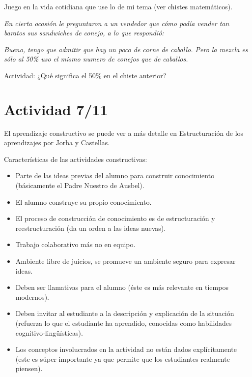 \documentclass[12pt]{report}
\newcounter{it}
\theoremstyle{largebreak}
\begin{document}
    \begin{excer}
        Juego en la vida cotidiana que use lo de mi tema (ver chistes matemáticos).
    \end{excer}

    \begin{center}
        \textit{En cierta ocasión le preguntaron a un vendedor que cómo podía vender tan baratos sus sandwiches de conejo, a lo que respondió:}

        \textit{Bueno, tengo que admitir que hay un poco de carne de caballo. Pero la mezcla es sólo al 50\% uso el mismo numero de conejos que de caballos.}
    \end{center}

    Actividad: ¿Qué significa el 50\% en el chiste anterior?

    \section{Actividad 7/11}

    El aprendizaje constructivo se puede ver a más detalle en Estructuración de los aprendizajes por Jorba y Castellas.

    Características de las actividades constructivas:
    \begin{itemize}
        \item Parte de las ideas previas del alumno para construir conocimiento (básicamente el Padre Nuestro de Ausbel).
        \item El alumno construye su propio conocimiento.
        \item El proceso de construcción de conocimiento es de estructuración y reestructuración (da un orden a las ideas nuevas). 
        \item Trabajo colaborativo más no en equipo.
        \item Ambiente libre de juicios, se promueve un ambiente seguro para expresar ideas.
        \item Deben ser llamativas para el alumno (éste es más relevante en tiempos modernos).
        \item Deben invitar al estudiante a la descripción y explicación de la situación (refuerza lo que el estudiante ha aprendido, conocidas como habilidades cognitivo-lingüísticas).
        \item Los conceptos involucrados en la actividad no están dados explícitamente (este es súper importante ya que permite que los estudiantes realmente piensen).
    \end{itemize}
\end{document}
